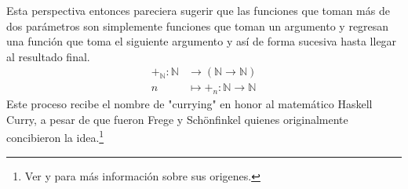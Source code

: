 \documentclass{article}
\begin{document}
    Esta perspectiva entonces pareciera sugerir que las funciones que toman más
    de dos parámetros son simplemente funciones que toman un argumento y 
    regresan una función que toma el siguiente argumento y así de forma
    sucesiva hasta llegar al resultado final.
    \begin{align*}
        +_\mathbb{N} : \mathbb{N} &\rightarrow (\mathbb{N} \rightarrow \mathbb{N})\\
        n &\mapsto +_n : \mathbb{N} \rightarrow \mathbb{N}
    \end{align*}
    Este proceso recibe el nombre de "currying" en honor al matemático Haskell 
    Curry, a pesar de que fueron Frege y Schönfinkel quienes originalmente 
    concibieron la idea.\footnote{Ver \cite{schonfinkel} y \cite{frege}
    para más información sobre sus origenes.}
\end{document}
